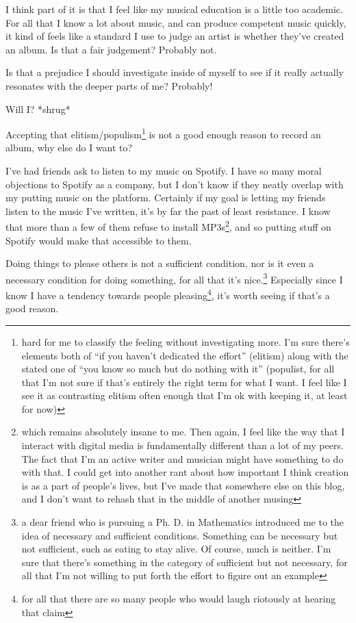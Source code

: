 \documentclass[12pt]{article}[titlepage]
\newcommand{\say}[1]{``#1''}
\newcommand{\1}{\={a}}
\newcommand{\2}{\={e}}
\newcommand{\3}{\={\i}}
\newcommand{\4}{\=o}
\newcommand{\5}{\=u}
\newcommand{\6}{\={A}}
\renewcommand{\,}{\textsuperscript{,}}
\begin{document}
I think part of it is that I feel like my musical education is a little too academic.
For all that I know a lot about music, and can produce competent music quickly, it kind of feels like a standard I use to judge an artist is whether they've created an album.
Is that a fair judgement?
Probably not.

Is that a prejudice I should investigate inside of myself to see if it really actually resonates with the deeper parts of me?
Probably!

Will I?
*shrug*

Accepting that elitism/populism\footnote{hard for me to classify the feeling without investigating more. I'm sure there's elements both of \say{if you haven't dedicated the effort} (elitism) along with the stated one of \say{you know so much but do nothing with it} (populist, for all that I'm not sure if that's entirely the right term for what I want. I feel like I see it as contrasting elitism often enough that I'm ok with keeping it, at least for now)}
is not a good enough reason to record an album, why else do I want to?

I've had friends ask to listen to my music on Spotify.
I have so many moral objections to Spotify as a company, but I don't know if they neatly overlap with my putting music on the platform.
Certainly if my goal is letting my friends listen to the music I've written, it's by far the past of least resistance. 
I know that more than a few of them refuse to install MP3s\footnote{which remains absolutely insane to me. Then again, I feel like the way that I interact with digital media is fundamentally different than a lot of my peers.
The fact that I'm an active writer and musician might have something to do with that.
I could get into another rant about how important I think creation is as a part of people's lives, but I've made that somewhere else on this blog, and I don't want to rehash that in the middle of another musing},
and so putting stuff on Spotify would make that accessible to them.

Doing things to please others is not a sufficient condition, nor is it even a necessary condition for doing something, for all that it's nice.\footnote{a dear friend who is pursuing a Ph. D. in Mathematics introduced me to the idea of necessary and sufficient conditions. Something can be necessary but not sufficient, such as eating to stay alive. Of course, much is neither. I'm sure that there's something in the category of sufficient but not necessary, for all that I'm not willing to put forth the effort to figure out an example}
Especially since I know I have a tendency towards people pleasing\footnote{for all that there are so many people who would laugh riotously at hearing that claim}, it's worth seeing if that's a good reason.
\end{document}
